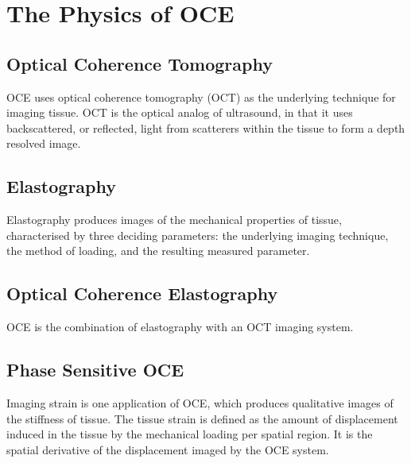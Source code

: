 \chapter{The Physics of OCE}

\section{Optical Coherence Tomography}
OCE uses optical coherence tomography (OCT) as the underlying technique for imaging tissue. OCT is the optical analog of ultrasound, in that it uses backscattered, or reflected, light from scatterers within the tissue to form a depth resolved image. 

\section{Elastography}
Elastography produces images of the mechanical properties of tissue, characterised by three deciding parameters: the underlying imaging technique, the method of loading, and the resulting measured parameter. 

\section{Optical Coherence Elastography}
OCE is the combination of elastography with an OCT imaging system. 


\section{Phase Sensitive OCE}
Imaging strain is one application of OCE, which produces qualitative images of the stiffness of tissue. The tissue strain is defined as the amount of displacement induced in the tissue by the mechanical loading per spatial region. It is the spatial derivative of the displacement imaged by the OCE system.

